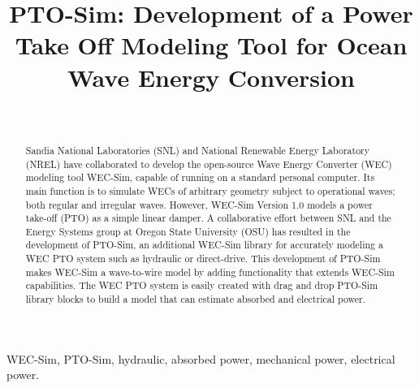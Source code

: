 \documentclass[conference]{IEEEtran}
\begin{document}
\title{
    PTO-Sim: Development of a Power Take Off Modeling Tool for Ocean Wave Energy Conversion
    }


\author{
    \\
        }
\maketitle


\begin{abstract}
Sandia National Laboratories (SNL) and National Renewable Energy Laboratory (NREL) have collaborated to develop the open-source Wave Energy Converter (WEC) modeling tool WEC-Sim, capable of running on a standard personal computer. Its main function is to simulate WECs of arbitrary geometry subject to operational waves; both regular and irregular waves. However, WEC-Sim Version 1.0 models a power take-off (PTO) as a simple linear damper. A collaborative effort between SNL and the Energy Systems group at Oregon State University (OSU) has resulted in the development of PTO-Sim, an additional WEC-Sim library for accurately modeling a WEC PTO system such as hydraulic or direct-drive. This development of PTO-Sim makes WEC-Sim a wave-to-wire model by adding functionality that extends WEC-Sim capabilities. The WEC PTO system is easily created with drag and drop PTO-Sim library blocks to build a model that can estimate absorbed and electrical power.   
\end{abstract}


\begin{IEEEkeywords}
WEC-Sim, PTO-Sim, hydraulic, absorbed power, mechanical power, electrical power. 
\end{IEEEkeywords}
\end{document}
